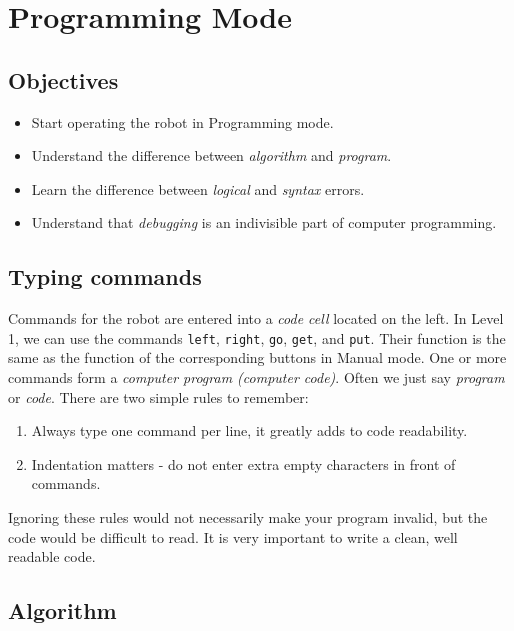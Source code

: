 \section{Programming Mode} \label{sec:bridge}

\subsection{Objectives} 
 
\begin{itemize}
\item Start operating the robot in Programming mode.
\item Understand the difference between {\em algorithm} and {\em program}. 
\item Learn the difference between {\em logical} and {\em syntax} errors.
\item Understand that {\em debugging} is an indivisible part of computer programming.
\end{itemize}

\subsection{Typing commands}

Commands for the robot are entered into a {\em code cell} located on the left.
In Level 1, we can use the commands {\tt left}, {\tt right}, {\tt go}, {\tt get}, and {\tt put}.
Their function is the same as the function of the corresponding buttons in Manual mode.
One or more commands form a {\em computer program (computer code)}. Often 
we just say {\em program} or {\em code}.
There are two simple rules to remember:\\

\begin{gbox}
\begin{enumerate}
\item Always type one command per line, it greatly adds to code readability.
\item Indentation matters - do not enter extra empty characters in front of commands. 
\end{enumerate}
\end{gbox}
\vspace{6mm}

\noindent
Ignoring these rules would not necessarily make your program invalid, 
but the code would be difficult to read. It is very important to write 
a clean, well readable code. 

\subsection{Algorithm} \label{subsec:interm1}

